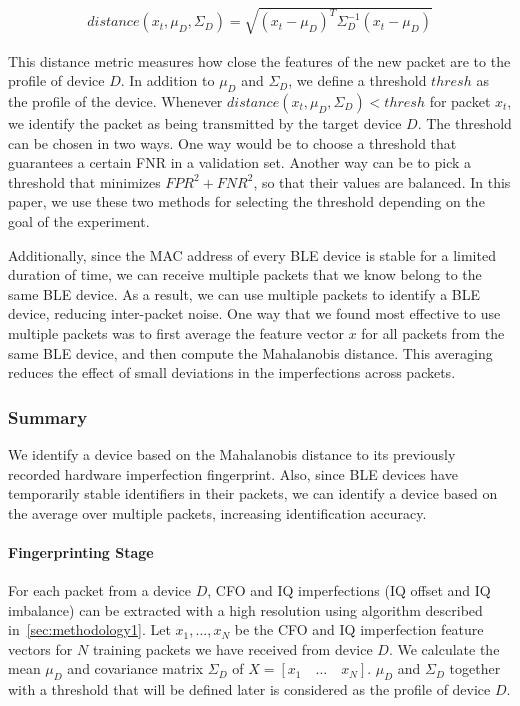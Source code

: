 \begin{gather*}
    distance(x_t,\mu_D,\Sigma_D) = \sqrt{(x_t-\mu_D)^T\Sigma_D^{-1}(x_t-\mu_D)}
\end{gather*}

This distance metric measures how close the features of the new packet are to the profile of device $D$. In addition to $\mu_D$ and $\Sigma_D$, we define a threshold $thresh$ as the profile of the device. Whenever $distance(x_t,\mu_D,\Sigma_D)<thresh$ for packet $x_t$, we identify the packet as being transmitted by the target device $D$. The threshold can be chosen in two ways. One way would be to choose a threshold that guarantees a certain FNR in a validation set. Another way can be to pick a threshold that minimizes $FPR^2+FNR^2$, so that their values are balanced. In this paper, we use these two methods for selecting the threshold depending on the goal of the experiment.

Additionally, since the MAC address of every BLE device is stable for a limited duration of time, we can receive multiple packets that we know belong to the same BLE device. As a result, we can use multiple packets to identify a BLE device, reducing inter-packet noise. One way that we found most effective to use multiple packets was to first average the feature vector $x$ for all packets from the same BLE device, and then compute the Mahalanobis distance. This averaging reduces the effect of small deviations in the imperfections across packets.

\subsubsection*{Summary} We identify a device based on the Mahalanobis distance to its previously recorded hardware imperfection fingerprint. Also, since BLE devices have temporarily stable identifiers in their packets, we can identify a device based on the average over multiple packets, increasing identification accuracy.

\paragraph{Fingerprinting Stage} For each packet from a device $D$, CFO and IQ imperfections (IQ offset and IQ imbalance) can be extracted with a high resolution using algorithm described in~\ref{sec:methodology1}. Let $x_1,...,x_N$ be the CFO and IQ imperfection feature vectors for $N$ training packets we have received from device $D$. We calculate the mean $\mu_D$ and covariance matrix $\Sigma_D$ of $X = [x_1 \quad ... \quad x_N]$. $\mu_D$ and $\Sigma_D$ together with a threshold that will be defined later is considered as the profile of device $D$.



